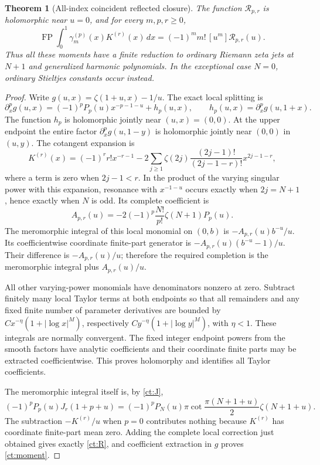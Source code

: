 \documentclass[11pt,a4paper]{article}
\numberwithin{equation}{section}
\newtheorem{theorem}{Theorem}[section]
\theoremstyle{definition}
\theoremstyle{remark}
\begin{document}
\begin{theorem}[All-index coincident reflected closure]
\label{ct:closure}
The function $\mathcal R_{p,r}$ is holomorphic near $u=0$, and for every
$m,p,r\ge0$,
\begin{equation}\label{ct:moment}
 \boxed{\displaystyle
 \operatorname{FP}\int_0^1\gamma_m^{(p)}(x)K^{(r)}(x)\,dx
       =(-1)^m m!\,[u^m]\mathcal R_{p,r}(u).}
\end{equation}
Thus all these moments have a finite reduction to ordinary Riemann zeta
jets at $N+1$ and generalized harmonic polynomials. In the exceptional
case $N=0$, ordinary Stieltjes constants occur instead.
\end{theorem}
\begin{proof}
Write $g(u,x)=\zeta(1+u,x)-1/u$. The exact local splitting is
\[
 \partial_x^pg(u,x)
   =(-1)^pP_p(u)x^{-p-1-u}+h_p(u,x),\qquad
 h_p(u,x)=\partial_x^pg(u,1+x).
\]
The function $h_p$ is holomorphic jointly near $(u,x)=(0,0)$.
At the upper endpoint the entire factor $\partial_x^pg(u,1-y)$ is
holomorphic jointly near $(0,0)$ in $(u,y)$. The cotangent expansion is
\[
 K^{(r)}(x)=(-1)^rr!x^{-r-1}
 -2\sum_{j\ge1}\zeta(2j)
        \frac{(2j-1)!}{(2j-1-r)!}x^{2j-1-r},
\]
where a term is zero when $2j-1<r$.
In the product of the varying singular power with this expansion,
resonance with $x^{-1-u}$ occurs exactly when
$2j=N+1$, hence exactly when $N$ is odd. Its complete coefficient is
\[
 A_{p,r}(u)
 =-2(-1)^p\frac{N!}{p!}\zeta(N+1)P_p(u).
\]
The meromorphic integral of this local monomial on $(0,b)$ is
$-A_{p,r}(u)b^{-u}/u$. Its coefficientwise coordinate finite-part
generator is $-A_{p,r}(u)(b^{-u}-1)/u$. Their difference is
$-A_{p,r}(u)/u$; therefore the required completion is the meromorphic
integral plus $A_{p,r}(u)/u$.

All other varying-power monomials have denominators nonzero at zero.
Subtract finitely many local Taylor terms at both endpoints so that all
remainders and any fixed finite number of parameter derivatives are
bounded by $Cx^{-\eta}(1+|\log x|^M)$, respectively
$Cy^{-\eta}(1+|\log y|^M)$, with $\eta<1$. These integrals are normally
convergent. The fixed integer endpoint powers from the smooth factors
have analytic coefficients and their coordinate finite parts may be
extracted coefficientwise. This proves holomorphy and identifies all
Taylor coefficients.

The meromorphic integral itself is, by \eqref{ct:J},
\[
 (-1)^pP_p(u)J_r(1+p+u)
 =(-1)^pP_N(u)\pi\cot\frac{\pi(N+1+u)}2\zeta(N+1+u).
\]
The subtraction $-K^{(r)}/u$ when $p=0$ contributes nothing because
$K^{(r)}$ has coordinate finite-part mean zero. Adding the complete
local correction just obtained gives exactly \eqref{ct:R}, and
coefficient extraction in $g$ proves \eqref{ct:moment}.
\end{proof}
\end{document}
